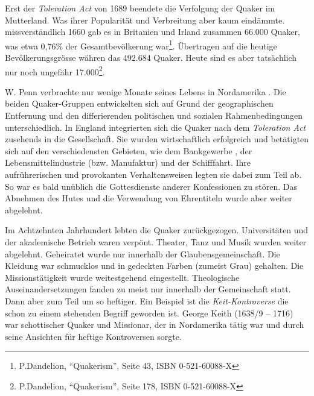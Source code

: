 \medskip

Erst der \textit{Toleration Act}  von 1689 beendete die
Verfolgung der Quaker im
Mutterland. Was ihrer Popularität und Verbreitung aber kaum eindämmte.%
missverständlich%
  1660 gab
es in Britanien  und Irland  zusammen
66.000 Quaker, was etwa 0,76\% der
Gesamtbevölkerung war\footnote{P.Dandelion, "`Quakerism"', Seite 43, ISBN
0-521-60088-X}. Übertragen auf die heutige Bevölkerungsgrösse währen das 492.684
Quaker. Heute sind es aber tatsächlich nur noch ungefähr
17.000\footnote{P.Dandelion, "`Quakerism"', Seite 178, ISBN 0-521-60088-X}.

\medskip

W. Penn verbrachte nur wenige Monate seines Lebens in Nordamerika
. Die beiden
Quaker-Gruppen entwickelten sich auf Grund der geographischen Entfernung und den
differierenden politischen und sozialen Rahmenbedingungen unterschiedlich. In
England integrierten sich die Quaker nach dem \textit{Toleration Act} zusehends
in die Gesellschaft. Sie wurden  wirtschaftlich
erfolgreich und betätigten sich
auf den verschiedensten Gebieten, wie dem Bankgewerbe , der
Lebensmittelindustrie 
(bzw. Manufaktur) und der Schifffahrt. Ihre aufrührerischen und provokanten
Verhaltensweisen legten sie dabei zum Teil ab. So war es bald unüblich die
Gottesdienste  anderer Konfessionen
 zu stören. Das Abnehmen des Hutes und die
Verwendung von Ehrentiteln wurde aber weiter abgelehnt.

\medskip

Im Achtzehnten Jahrhundert lebten die Quaker zurückgezogen.
Universitäten  und der akademische Betrieb waren verpönt.
 Theater, Tanz  und Musik 
wurden weiter abgelehnt. Geheiratet  wurde nur innerhalb der
Glaubensgemeinschaft. Die Kleidung  war schmucklos und in
gedeckten Farben
(zumeist Grau) gehalten. Die Missionstätigkeit wurde weitestgehend eingestellt.
Theologische Auseinandersetzungen fanden zu meist nur innerhalb der Gemeinschaft
statt. Dann aber zum Teil um so heftiger. Ein Beispiel ist die
\textit{Keit-Kontroverse}  die schon zu einem stehenden
Begriff geworden ist.
George Keith (1638/9 -- 1716)  war schottischer
Quaker und Missionar, der in
Nordamerika tätig war und durch seine Ansichten für heftige Kontroversen
sorgte. 

